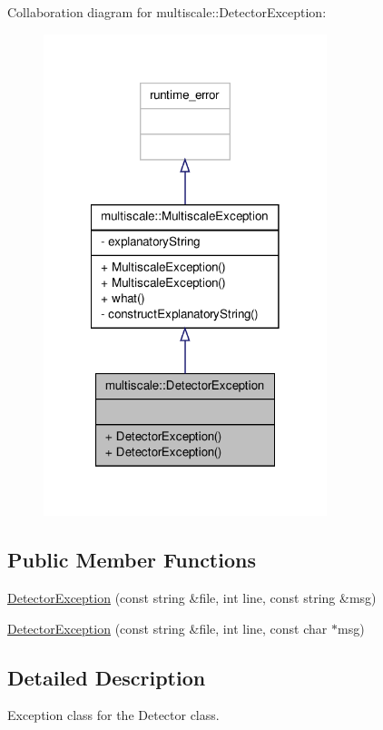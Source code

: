 Collaboration diagram for multiscale\-:\-:Detector\-Exception\-:
\nopagebreak
\begin{figure}[H]
\begin{center}
\leavevmode
\includegraphics[width=234pt]{classmultiscale_1_1DetectorException__coll__graph}
\end{center}
\end{figure}
\subsection*{Public Member Functions}
\begin{DoxyCompactItemize}
\item 
\hyperlink{classmultiscale_1_1DetectorException_a7b997e90b2f84d96a94879f9ba61bf36}{Detector\-Exception} (const string \&file, int line, const string \&msg)
\item 
\hyperlink{classmultiscale_1_1DetectorException_a5f2b9b78c64aa3362faaf472ccb97cc7}{Detector\-Exception} (const string \&file, int line, const char $\ast$msg)
\end{DoxyCompactItemize}


\subsection{Detailed Description}
Exception class for the Detector class. 

